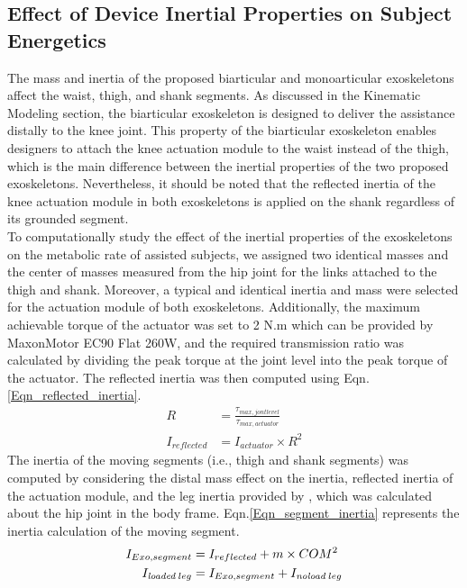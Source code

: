 \documentclass[10pt,letterpaper]{article}
\begin{document}
\subsection*{Effect of Device Inertial Properties on Subject Energetics}
The mass and inertia of the proposed biarticular and monoarticular exoskeletons affect the waist, thigh, and shank segments. As discussed in the Kinematic Modeling section, the biarticular exoskeleton is designed to deliver the assistance distally to the knee joint. This property of the biarticular exoskeleton enables designers to attach the knee actuation module to the waist instead of the thigh, which is the main difference between the inertial properties of the two proposed exoskeletons. Nevertheless, it should be noted that the reflected inertia of the knee actuation module in both exoskeletons is applied on the shank regardless of its grounded segment.\\
To computationally study the effect of the inertial properties of the exoskeletons on the metabolic rate of assisted subjects, we assigned two identical masses and the center of masses measured from the hip joint for the links attached to the thigh and shank. Moreover, a typical and identical inertia and mass were selected for the actuation module of both exoskeletons. Additionally, the maximum achievable torque of the actuator was set to 2 N.m which can be provided by MaxonMotor EC90 Flat 260W, and the required transmission ratio was calculated by dividing the peak torque at the joint level into the peak torque of the actuator. The reflected inertia was then computed using Eqn.\eqref{Eqn_reflected_inertia}.\\
\begin{equation}\label{Eqn_reflected_inertia}
\begin{aligned}
R &= \frac{\tau_{max,jont level}}{\tau_{max,actuator}}\\
I_{reflected} &= I_{actuator}\times R^{2}
\end{aligned}
\end{equation}
The inertia of the moving segments (i.e., thigh and shank segments) was computed by considering the distal mass effect on the inertia, reflected inertia of the actuation module, and the leg inertia provided by \cite{133}, which was calculated about the hip joint in the body frame. Eqn.\eqref{Eqn_segment_inertia} represents the inertia calculation of the moving segment.
\begin{equation}\label{Eqn_segment_inertia}
\begin{aligned}
I_{Exo,segment} &= I_{reflected} + m\times COM^{2}\\
I_{\textit{loaded}\;leg} &= I_{Exo,segment} + I_{\textit{\textit{noload}}\;leg}
\end{aligned}
\end{equation}
\end{document}
